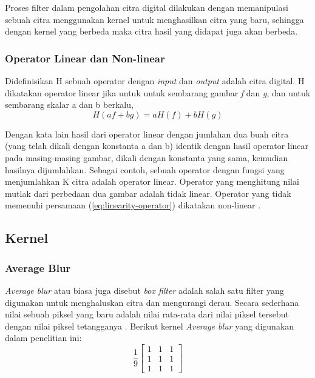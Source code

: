 Proses filter dalam pengolahan citra digital dilakukan dengan memanipulasi sebuah citra menggunakan kernel untuk menghasilkan citra yang baru, sehingga dengan kernel yang berbeda maka citra hasil yang didapat juga akan berbeda. 


\subsubsection{Operator Linear dan Non-linear}
Didefinisikan H sebuah operator dengan \textit{input} dan \textit{output} adalah citra digital. H dikatakan operator linear jika untuk untuk sembarang gambar \textit{f} dan \textit{g}, dan untuk sembarang skalar a dan b berkalu,
\begin{equation}
    \label{eq:linearity-operator}
    H(af + bg) = aH(f) + bH(g)
\end{equation}

Dengan kata lain hasil dari operator linear dengan jumlahan dua buah citra (yang telah dikali dengan konstanta a dan b) identik dengan hasil operator linear pada masing-masing gambar, dikali dengan konstanta yang sama, kemudian hasilnya dijumlahkan. Sebagai contoh, sebuah operator dengan fungsi yang menjumlahkan K citra adalah operator linear. Operator yang menghitung nilai mutlak dari perbedaan dua gambar adalah tidak linear. Operator yang tidak memenuhi persamaan (\ref{eq:linearity-operator}) dikatakan non-linear \cite{book:gonzalez}.


\subsection{Kernel}

\subsubsection{Average Blur}
\textit{Average blur} atau biasa juga disebut \textit{box filter} adalah salah satu filter yang digunakan untuk menghaluskan citra dan mengurangi derau. Secara sederhana nilai sebuah piksel yang baru adalah nilai rata-rata dari nilai piksel tersebut dengan nilai piksel tetangganya \cite{pdf:marcin}. Berikut kernel \textit{Average blur} yang digunakan dalam penelitian ini:
\begin{equation}
    \label{kernel:average}
    \frac{1}{9} \left[
    \begin{matrix}
 1 & 1 & 1 \\
 1 & 1 & 1 \\
 1 & 1 & 1
    \end{matrix}
    \right]
\end{equation}

